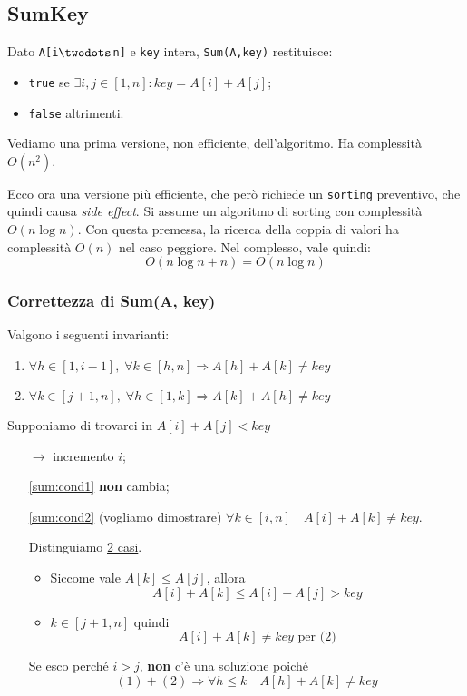 \subsection{SumKey}
Dato \texttt{A[i$\twodots$n]} e \texttt{key} intera, \texttt{Sum(A,key)} restituisce:
\begin{itemize}
	\item \texttt{true} se $\exists i, j \in [1,n] : key = A[i] + A[j]$;
	\item \texttt{false} altrimenti.
\end{itemize}

Vediamo una prima versione, non efficiente, dell'algoritmo. Ha complessità $O(n^2)$.


Ecco ora una versione più efficiente, che però richiede un \texttt{sorting} preventivo, che quindi causa \emph{side effect}. Si assume un 
algoritmo di sorting con complessità $O(n \log n)$. Con questa premessa, la ricerca della coppia di valori
ha complessità $O(n)$ nel caso peggiore. Nel complesso, vale quindi:
$$O(n \log n + n) = O(n \log n)$$


\subsubsection{Correttezza di Sum(A, key)}
Valgono i seguenti invarianti:
\begin{enumerate}[label=(\arabic*)]
	\item \label{sum:cond1}$\forall h \in [1, i-1], \; \forall k \in [h, n] \Rightarrow A[h] + A[k] \neq key$
	\item \label{sum:cond2}$\forall k \in [j+1,n], \; \forall h \in [1,k] \Rightarrow A[k] + A[h] \neq key$
\end{enumerate}
Supponiamo di trovarci in $A[i] + A[j] < key$
\begin{itemize}[noitemsep]
	\item[$\rightarrow$] incremento $i$;
	\item[\ref{sum:cond1}] \textbf{non} cambia;
	\item[\ref{sum:cond2}] (vogliamo dimostrare) $\forall k \in [i,n] \quad A[i] + A[k] \neq key$.\par
		Distinguiamo \underline{2 casi}.
		\begin{itemize}
			\item Siccome vale $A[k] \leq A[j]$, allora
				$$A[i] + A[k] \leq A[i] + A[j] > key$$
			\item $k \in [j+1,n]$ quindi
			$$A[i] + A[k] \neq key \text{ per (2)}$$
		\end{itemize}
		Se esco perché $i > j$, \textbf{non} c'è una soluzione poiché
		$$(1) + (2) \Rightarrow \forall h \leq k \quad A[h] + A[k] \neq key$$ 
\end{itemize}

